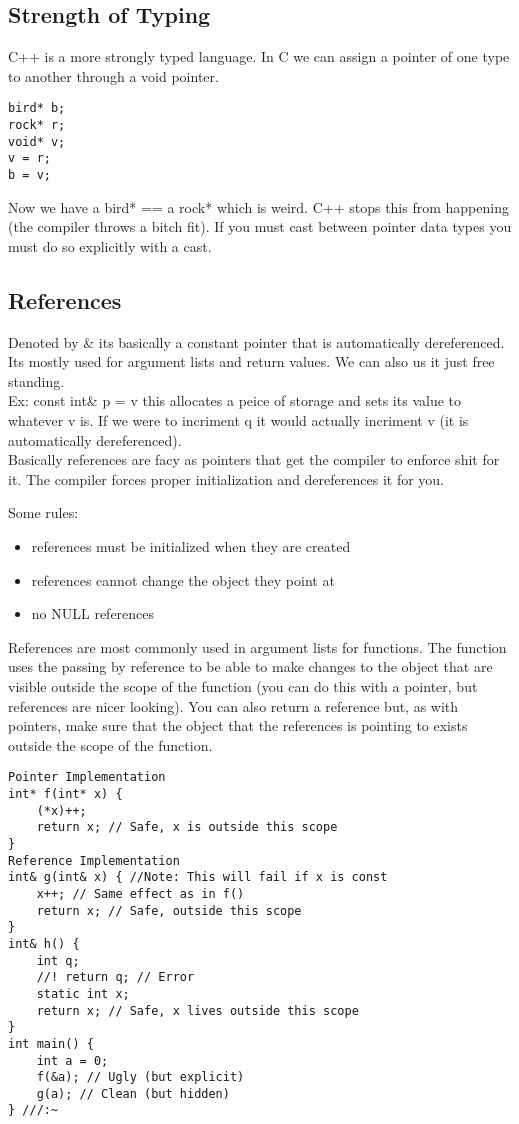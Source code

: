 \documentclass[12pt]{article}
\begin{document}
\subsection*{Strength of Typing}
C++ is a more strongly typed language. In C we can assign a pointer of one type to another through a void pointer.
\begin{lstlisting}
bird* b;
rock* r;
void* v;
v = r;
b = v;
\end{lstlisting}
Now we have a bird* == a rock* which is weird. C++ stops this from happening (the compiler throws a bitch fit). If you must cast between pointer data types you must do so explicitly with a cast.
\subsection*{References}
Denoted by \& its basically a constant pointer that is automatically dereferenced. Its mostly used for argument lists and return values. We can also us it just free standing.\\
Ex: const int\& p = v this allocates a peice of storage and sets its value to whatever v is. If we were to incriment q it would actually incriment v (it is automatically dereferenced).\\
Basically references are facy as pointers that get the compiler to enforce shit for it. The compiler forces proper initialization and dereferences it for you.

Some rules:
\begin{itemize}
\item references must be initialized when they are created
\item references cannot change the object they point at
\item no NULL references
\end{itemize}

References are most commonly used in argument lists for functions. The function uses the passing by reference to be able to make changes to the object that are visible outside the scope of the function (you can do this with a pointer, but references are nicer looking). You can also return a reference but, as with pointers, make sure that the object that the references is pointing to exists outside the scope of the function.
\begin{lstlisting}
Pointer Implementation
int* f(int* x) {
    (*x)++;
    return x; // Safe, x is outside this scope
}
Reference Implementation
int& g(int& x) { //Note: This will fail if x is const
    x++; // Same effect as in f()
    return x; // Safe, outside this scope
}
int& h() {
    int q;
    //! return q; // Error
    static int x;
    return x; // Safe, x lives outside this scope
}
int main() {
    int a = 0;
    f(&a); // Ugly (but explicit)
    g(a); // Clean (but hidden)
} ///:~
\end{lstlisting}
\end{document}
